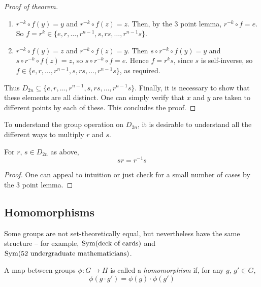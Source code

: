 \documentclass{../template/note}
\begin{document}
\begin{proof}[Proof of theorem]
        \begin{enumerate}[label=\protect\circled{\arabic*}]
            \item \(r^{-k} \circ f(y) = y\) and \(r^{-k} \circ f(z) = z\). Then, by the 3 point lemma, \(r^{-k} \circ f = e\). So \(f = r^k \in \{e, r, \dots, r^{n-1}, s, rs, \dots, r^{n-1}s\}\).
            \item \(r^{-k} \circ f(y) = z\) and \(r^{-k} \circ f(z) = y\). Then \(s \circ r^{-k} \circ f(y) = y\) and \(s \circ r^{-k} \circ f(z) = z\), so \(s \circ r^{-k} \circ f = e\). Hence \(f = r^ks\), since \(s\) is self-inverse, so \(f \in \{e, r, \dots, r^{n-1}, s, rs, \dots, r^{n-1}s\}\), as required.
        \end{enumerate}
        
        Thus \(D_{2n} \subseteq \{e, r, \dots, r^{n-1}, s, rs, \dots, r^{n-1}s\}\). Finally, it is necessary to show that these elements are all distinct. One can simply verify that \(x\) and \(y\) are taken to different points by each of these. This concludes the proof.
        
    \end{proof}
    
    To understand the group operation on \(D_{2n}\), it is desirable to understand all the different ways to multiply \(r\) and \(s\).

    \begin{lemma}
        For \(r\), \(s \in D_{2n}\) as above,
        \[
            sr = r^{-1}s
        \]
    \end{lemma}
    
    \begin{proof}
        One can appeal to intuition or just check for a small number of cases by the 3 point lemma.
    \end{proof}
    
    
    \subsection{Homomorphisms}

    Some groups are not set-theoretically equal, but nevertheless have the same structure -- for example, \(\operatorname{Sym}(\text{deck of cards})\) and \(\operatorname{Sym}(\text{52 undergraduate mathematicians})\).

    \begin{definition}[Homomorphism]
        A map between groups \(\phi: G \to H\) is called a \emph{homomorphism} if, for any \(g\), \(g' \in G\),
        \[
            \phi(g \cdot g') = \phi(g) \cdot \phi(g')
        \]
    \end{definition}
    
\end{document}
